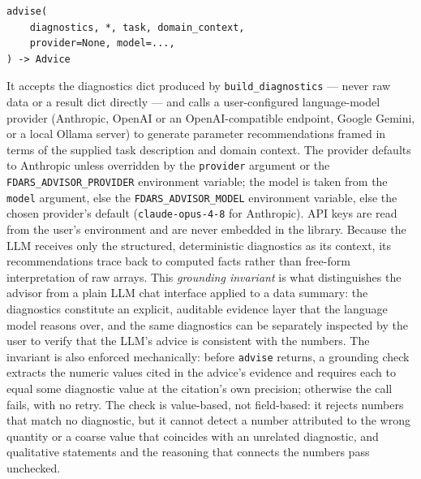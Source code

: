 \begin{lstlisting}[style=fdarsinput]
advise(
    diagnostics, *, task, domain_context,
    provider=None, model=...,
) -> Advice
\end{lstlisting}
    It accepts the diagnostics
    dict produced by \texttt{build\_diagnostics} --- never raw data or a
    result dict directly --- and calls a user-configured language-model
    provider (Anthropic, OpenAI or an OpenAI-compatible endpoint, Google
    Gemini, or a local Ollama server) to generate parameter recommendations
    framed in terms of the supplied task description and domain context.  The
    provider defaults to Anthropic unless overridden by the
    \texttt{provider} argument or the \texttt{FDARS\_ADVISOR\_PROVIDER}
    environment variable; the model is taken from the \texttt{model}
    argument, else the \texttt{FDARS\_ADVISOR\_MODEL} environment variable,
    else the chosen provider's default (\texttt{claude-opus-4-8} for
    Anthropic).  API keys are read
    from the user's environment and are never embedded in the library.  Because the LLM receives only the structured,
    deterministic diagnostics as its context, its recommendations trace back
    to computed facts rather than free-form interpretation of raw arrays.
    This \emph{grounding invariant} is what distinguishes the advisor from a
    plain LLM chat interface applied to a data summary: the diagnostics
    constitute an explicit, auditable evidence layer that the language model
    reasons over, and the same diagnostics can be separately inspected by the
    user to verify that the LLM's advice is consistent with the numbers.
    The invariant is also enforced mechanically: before \texttt{advise}
    returns, a grounding check extracts the numeric values cited in the
    advice's evidence and requires each to equal some diagnostic value at
    the citation's own precision; otherwise the call fails, with no retry.
    The check is value-based, not field-based: it rejects numbers that match
    no diagnostic, but it cannot detect a number attributed to the wrong
    quantity or a coarse value that coincides with an unrelated diagnostic,
    and qualitative statements and the reasoning that connects the numbers
    pass unchecked.

